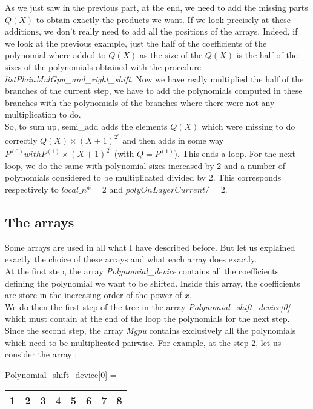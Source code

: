 As we just saw in the previous part, at the end, we need to add the missing parts $Q(X)$ to obtain exactly the products we want. If we look precisely at these additions, we don't really need to add all the positions of the arrays. Indeed, if we look at the previous example, just the half of the coefficients of the polynomial where added to $Q(X)$ as the size of the $Q(X)$ is the half of the sizes of the polynomials obtained with the procedure \textit{listPlainMulGpu\_and\_right\_shift}. Now we have really multiplied the half of the branches of the current step, we have to add the polynomials computed in these branches with the polynomials of the branches where there were not any multiplication to do.\\

So, to sum up, semi\_add adds the elements $Q(X)$ which were missing to do correctly $Q(X) \times (X+1)^{2^i}$ and then adds in some way $P^{(0)} with P^{(1)}\times (X+1)^{2^i}$ (with $Q = P^{(1)}$). This ends a loop. For the next loop, we do the same with polynomial sizes increased by $2$ and a number of polynomials considered to be multiplicated divided by $2$. This corresponds respectively to $local\_n *= 2$ and $polyOnLayerCurrent /= 2$.\\

\subsection{The arrays}

Some arrays are used in all what I have described before. But let us explained exactly the choice of these arrays and what each array does exactly.\\

At the first step, the array \textit{Polynomial\_device} contains all the coefficients defining the polynomial we want to be shifted. Inside this array, the coefficients are store in the increasing order of the power of $x$.\\
We do then the first step of the tree in the array \textit{Polynomial\_shift\_device[0]} which must contain at the end of the loop the polynomials for the next step.\\

Since the second step, the array \textit{Mgpu} contains exclusively all the polynomials which need to be multiplicated pairwise. For example, at the step 2, let us consider the array :\\

\begin{center}
Polynomial\_shift\_device[0] = \begin{tabular}{|c|c||c|c||c|c||c|c|}
\hline
1 & 2 & 3 & 4 & 5 & 6 & 7 & 8 \\
\hline
\end{tabular}
\end{center}


